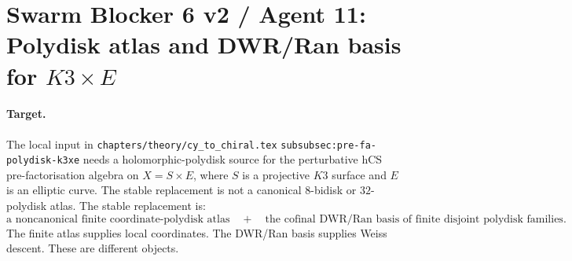 
\providecommand{\ClaimStatusTheorem}{\textbf{[theorem]}}
\providecommand{\ClaimStatusProvedHere}[1][]{\textbf{[proved here#1]}}
\providecommand{\ClaimStatusVerified}{\textbf{[verified]}}
\providecommand{\ClaimStatusDerivation}{\textbf{[derivation]}}
\providecommand{\ClaimStatusConstruction}{\textbf{[construction]}}
\providecommand{\ClaimStatusConjectural}{\textbf{[conjectural]}}
\providecommand{\ClaimStatusConditional}{\textbf{[conditional]}}
\providecommand{\ClaimStatusOpen}{\textbf{[open]}}
\providecommand{\ClaimStatusFalsified}{\textbf{[falsified]}}
\providecommand{\C}{\mathbb{C}}
\providecommand{\R}{\mathbb{R}}
\providecommand{\Z}{\mathbb{Z}}
\providecommand{\bP}{\mathbb{P}}
\providecommand{\bH}{\mathbb{H}}
\providecommand{\cO}{\mathcal{O}}
\providecommand{\cU}{\mathcal{U}}
\providecommand{\cD}{\mathcal{D}}
\providecommand{\cP}{\mathcal{P}}
\providecommand{\cV}{\mathcal{V}}
\providecommand{\cW}{\mathcal{W}}
\providecommand{\Obs}{\mathrm{Obs}}
\providecommand{\hCS}{\mathrm{hCS}}
\providecommand{\frakg}{\mathfrak{g}}
\providecommand{\dbar}{\bar\partial}
\providecommand{\Sym}{\mathrm{Sym}}
\providecommand{\Ran}{\operatorname{Ran}}
\providecommand{\hocolim}{\operatorname*{hocolim}}

\section*{Swarm Blocker 6 v2 / Agent 11: Polydisk atlas and
DWR/Ran basis for \texorpdfstring{$K3\times E$}{K3 x E}}
\label{sec:swarm-blocker6-v2-agent11-polydisk-atlas}

\paragraph{Target.}
The local input in
\verb|chapters/theory/cy_to_chiral.tex|
\verb|subsubsec:pre-fa-polydisk-k3xe|
needs a holomorphic-polydisk source for the perturbative hCS
pre-factorisation algebra on $X=S\times E$, where $S$ is a projective
$K3$ surface and $E$ is an elliptic curve. The stable replacement is
not a canonical $8$-bidisk or $32$-polydisk atlas. The stable
replacement is:
\[
\text{a noncanonical finite coordinate-polydisk atlas}
\quad+\quad
\text{the cofinal DWR/Ran basis of finite disjoint polydisk families}.
\]
The finite atlas supplies local coordinates. The DWR/Ran basis supplies
Weiss descent. These are different objects.

